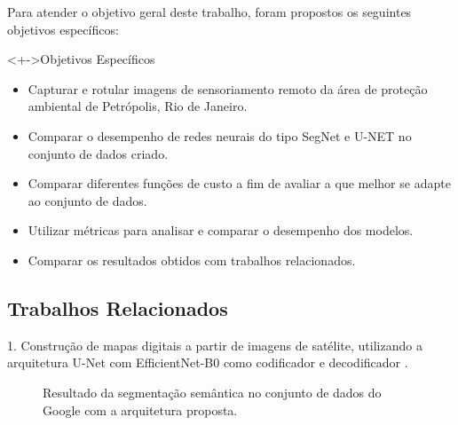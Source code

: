 \documentclass[%
  10pt,%
  aspectratio = 169,%
  compress,%
  t,%
  english,%
  brazilian,%
  tikz,
]{beamer}
\begin{document}
\begin{frame}
Para atender o objetivo geral deste trabalho, foram propostos os seguintes objetivos específicos:

\begin{block}<+->{Objetivos Específicos}
\begin{itemize}
\item Capturar e rotular imagens de sensoriamento remoto da área de proteção ambiental de
Petrópolis, Rio de Janeiro.
\item Comparar o desempenho de redes neurais do tipo SegNet e U-NET no conjunto de dados criado.
\item Comparar diferentes funções de custo a fim de avaliar a que melhor se adapte ao conjunto
de dados.
\item Utilizar métricas para analisar e comparar o desempenho dos modelos.
\item Comparar os resultados obtidos com trabalhos relacionados.
\end{itemize}
\end{block}
\end{frame}

\subsection{Trabalhos Relacionados}\label{sec:intro3}

\begin{frame}
    1. Construção de mapas digitais a partir de imagens de satélite, utilizando a arquitetura U-Net com EfficientNet-B0 como codificador e decodificador \textbf{\cite{Khanh2021}}.
    \begin{figure}[!htb]
        \centering%
        \caption{Resultado da segmentação semântica no conjunto de dados do Google com a arquitetura proposta.}%
        \label{fig:khan01}
    \end{figure}
    
\end{frame}
\end{document}
